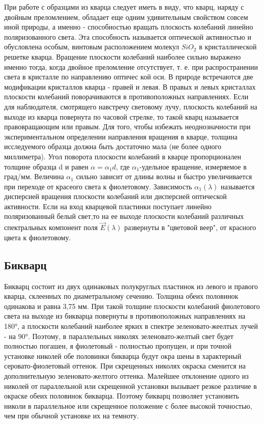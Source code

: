 При работе с образцами из кварца следует иметь в виду, что
кварц, наряду с двойным преломлением, обладает еще одним удивительным свойством совсем иной природы, а именно - способностью
вращать плоскость колебаний линейно поляризованного света. Эта
способность называется оптической активностью и обусловлена особым, винтовым расположением молекул $SiO_2$ в кристаллической решетке кварца. Вращение плоскости колебаний наиболее сильно
выражено именно тогда, когда двойное преломление отсутствует, т.
е. при распространении света в кристалле по направлению оптичес­
кой оси.
В природе встречаются две модификации кристаллов кварца -
правей и левая. В правых и левых кристаллах плоскости колебаний
поворачиваются в противоположных направлениях. Если для наблю­дателя, смотрящего навстречу световому лучу, плоскость колебаний
на выходе из кварца повернута по часовой стрелке, то такой кварц
называется правовращающим или правым. Для того, чтобы избежать
неоднозначности при экспериментальном определении направления
вращения в кварце, толщина исследуемого образца должна быть дос­таточно мала (не более одного миллиметра).
Угол поворота плоскости колебаний в кварце пропорционален
толщине образца d и равен $\alpha=\alpha_1d$, где $\alpha_1$-удельное вращение, измеряемое в град/мм. Величина $\alpha_1$ сильно зависит от длины волны и быстро увеличивается при переходе от красеого света к фиолетовому. 
Зависимость $\alpha_1(\lambda)$ называет­ся дисперсией вращения плоскости колебаний или дисперсией оптической активности.
Если на вход кварцевой пластинки поступает линейно поляризованный белый свет,то на ее выходе плоскости колебаний различных спектральных компонент поля $\vec{E}(\lambda)$ развернуты в "цветовой
веер", от красного цвета к фиолетовому.
\subsection{Бикварц}
Бикварц состоит из двух одинаковых полукруглых пластинок
из левого и правого кварца, склеенных по диаметральному сечению.
Толщина обеих половинок одинакова и равна 3,75 мм. При такой
толщине плоскости колебаний фиолетового света на выходе из би­кварца повернуты в противоположных направлениях на 180°, а плос­кости колебаний наиболее ярких в спектре зеленовато-жеелтых лучей - на 90°. Поэтому, в параллельных николях зеленовато-желтый
свет будет полностью погашен, я фиолетовый - полностью пропущен,
и при точной установке николей обе половинки бикварца будут окра­
шены в характерный серовато-фиолетовый оттенок.
При скрещенных николях окраска сменится на дополнительную
зеленовато-желтого оттенка. Малейшее отклонение одного из николей от параллельной или скрещенной установки вызывает резкое раз­личие в окраске обеих половинок бикварца. Поэтому бикварц позво­ляет установить николи в параллельное или скрещенное положение с
более высокой точностью, чем при обычной установке их на темноту.
